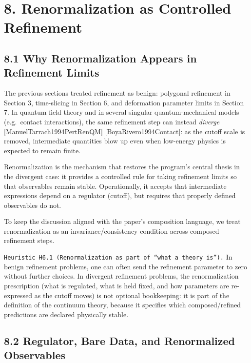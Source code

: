 \documentclass[
]{article}
\begin{document}
\section{8. Renormalization as Controlled
Refinement}\label{renormalization-as-controlled-refinement}

\subsection{8.1 Why Renormalization Appears in Refinement
Limits}\label{why-renormalization-appears-in-refinement-limits}

The previous sections treated refinement as benign: polygonal refinement
in Section 3, time-slicing in Section 6, and deformation parameter
limits in Section 7. In quantum field theory and in several singular
quantum-mechanical models (e.g.~contact interactions), the same
refinement step can instead \emph{diverge}
{[}ManuelTarrach1994PertRenQM{]} {[}BoyaRivero1994Contact{]}: as the
cutoff scale is removed, intermediate quantities blow up even when
low-energy physics is expected to remain finite.

Renormalization is the mechanism that restores the program's central
thesis in the divergent case: it provides a controlled rule for taking
refinement limits so that observables remain stable. Operationally, it
accepts that intermediate expressions depend on a regulator (cutoff),
but requires that properly defined observables do not.

To keep the discussion aligned with the paper's composition language, we
treat renormalization as an invariance/consistency condition across
composed refinement steps.

\texttt{Heuristic\ H6.1\ (Renormalization\ as\ part\ of\ “what\ a\ theory\ is”).}
In benign refinement problems, one can often send the refinement
parameter to zero without further choices. In divergent refinement
problems, the renormalization prescription (what is regulated, what is
held fixed, and how parameters are re-expressed as the cutoff moves) is
not optional bookkeeping: it is part of the definition of the continuum
theory, because it specifies which composed/refined predictions are
declared physically stable.

\subsection{8.2 Regulator, Bare Data, and Renormalized
Observables}\label{regulator-bare-data-and-renormalized-observables}
\end{document}
